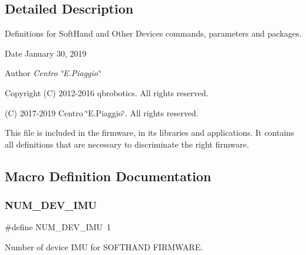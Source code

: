 \subsection{Detailed Description}
Definitions for Soft\+Hand and Other Devices commands, parameters and packages. 

\begin{DoxyDate}{Date}
January 30, 2019 
\end{DoxyDate}
\begin{DoxyAuthor}{Author}
{\itshape Centro \char`\"{}\+E.\+Piaggio\char`\"{}} 
\end{DoxyAuthor}
\begin{DoxyCopyright}{Copyright}
(C) 2012-\/2016 qbrobotics. All rights reserved. 

(C) 2017-\/2019 Centro \char`\"{}\+E.\+Piaggio\char`\"{}. All rights reserved.
\end{DoxyCopyright}
This file is included in the firmware, in its libraries and applications. It contains all definitions that are necessary to discriminate the right firmware. 

\subsection{Macro Definition Documentation}
\mbox{\label{_f_i_r_m_w_a_r_e___c_o_n_f_i_g_u_r_a_t_i_o_n_8h_a44dee30c25c70368dd064f50fcdc5c21}} 
\subsubsection{N\+U\+M\+\_\+\+D\+E\+V\+\_\+\+I\+MU}
{\footnotesize\ttfamily \#define N\+U\+M\+\_\+\+D\+E\+V\+\_\+\+I\+MU~1}

Number of device I\+MU for S\+O\+F\+T\+H\+A\+ND F\+I\+R\+M\+W\+A\+RE. 